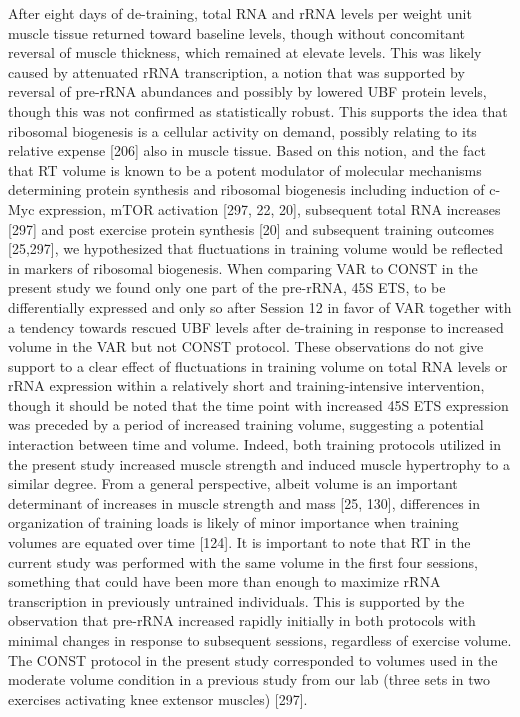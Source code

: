 \documentclass[twoside,10pt]{gihclass} %
\begin{document}
After eight days of de-training, total RNA and rRNA levels per weight unit muscle tissue returned toward baseline levels, though without concomitant reversal of muscle thickness, which remained at elevate levels.
This was likely caused by attenuated rRNA transcription, a notion that was supported by reversal of pre-rRNA abundances and possibly by lowered UBF protein levels, though this was not confirmed as statistically robust.
This supports the idea that ribosomal biogenesis is a cellular activity on demand, possibly relating to its relative expense {[}206{]} also in muscle tissue.
Based on this notion, and the fact that RT volume is known to be a potent modulator of molecular mechanisms determining protein synthesis and ribosomal biogenesis including induction of c-Myc expression, mTOR activation
{[}297, 22, 20{]},
subsequent total RNA increases {[}297{]} and post exercise protein synthesis {[}20{]}
and subsequent training outcomes {[}25,297{]}, we hypothesized that fluctuations in training volume would be reflected in markers of ribosomal biogenesis.
When comparing VAR to CONST in the present study we found only one part of the pre-rRNA, 45S ETS, to be differentially expressed and only so after Session 12 in favor of VAR together with a tendency towards rescued UBF levels after de-training in response to increased volume in the VAR but not CONST protocol.
These observations do not give support to a clear effect of fluctuations in training volume on total RNA levels or rRNA expression within a relatively short and training-intensive intervention, though it should be noted that the time point with increased 45S ETS expression was preceded by a period of increased training volume, suggesting a potential interaction between time and volume.
Indeed, both training protocols utilized in the present study increased muscle strength and induced muscle hypertrophy to a similar degree.
From a general perspective, albeit volume is an important determinant of increases in muscle strength and mass
{[}25, 130{]},
differences in organization of training loads is likely of minor importance when training volumes are equated over time
{[}124{]}.
It is important to note that RT in the current study was performed with the same volume in the first four sessions, something that could have been more than enough to maximize rRNA transcription in previously untrained individuals.
This is supported by the observation that pre-rRNA increased rapidly initially in both protocols with minimal changes in response to subsequent sessions, regardless of exercise volume.
The CONST protocol in the present study corresponded to volumes used in the moderate volume condition in a previous study from our lab (three sets in two exercises activating knee extensor muscles) {[}297{]}.
\end{document}
